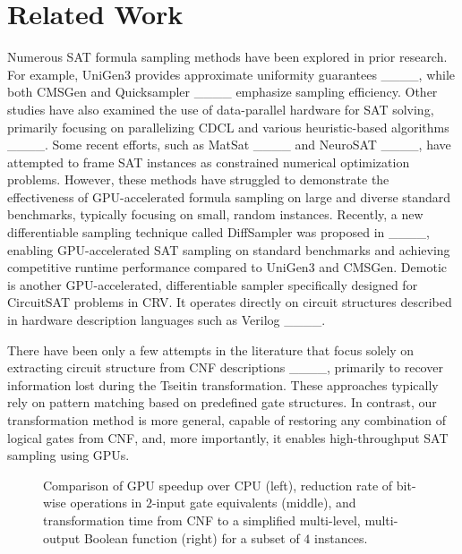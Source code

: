 \section{Related Work}
Numerous SAT formula sampling methods have been explored in prior research. For example, {\sc UniGen3} provides approximate uniformity guarantees ____, while both {\sc CMSGen} and {\sc Quicksampler} ____ emphasize sampling efficiency. Other studies have also examined the use of data-parallel hardware for SAT solving, primarily focusing on parallelizing CDCL and various heuristic-based algorithms ____. Some recent efforts, such as {\sc MatSat} ____ and {\sc NeuroSAT} ____, have attempted to frame SAT instances as constrained numerical optimization problems. However, these methods have struggled to demonstrate the effectiveness of GPU-accelerated formula sampling on large and diverse standard benchmarks, typically focusing on small, random instances. Recently, a new differentiable sampling technique called {\sc DiffSampler} was proposed in ____, enabling GPU-accelerated SAT sampling on standard benchmarks and achieving competitive runtime performance compared to {\sc UniGen3} and {\sc CMSGen}. {\sc Demotic} is another GPU-accelerated, differentiable sampler specifically designed for CircuitSAT problems in CRV. It operates directly on circuit structures described in hardware description languages such as Verilog ____.

There have been only a few attempts in the literature that focus solely on extracting circuit structure from CNF descriptions ____, primarily to recover information lost during the Tseitin transformation. These approaches typically rely on pattern matching based on predefined gate structures. In contrast, our transformation method is more general, capable of restoring any combination of logical gates from CNF, and, more importantly, it enables high-throughput SAT sampling using GPUs.

\begin{figure}[t]
    \centering
    \scalebox{0.85}{
    }
    \caption{Comparison of GPU speedup over CPU (left), reduction rate of bit-wise operations in $2$-input gate equivalents (middle), and transformation time from CNF to a simplified multi-level, multi-output Boolean function (right) for a subset of $4$ instances.}
    \label{fig5}
    \vspace{-0.3cm}
\end{figure}